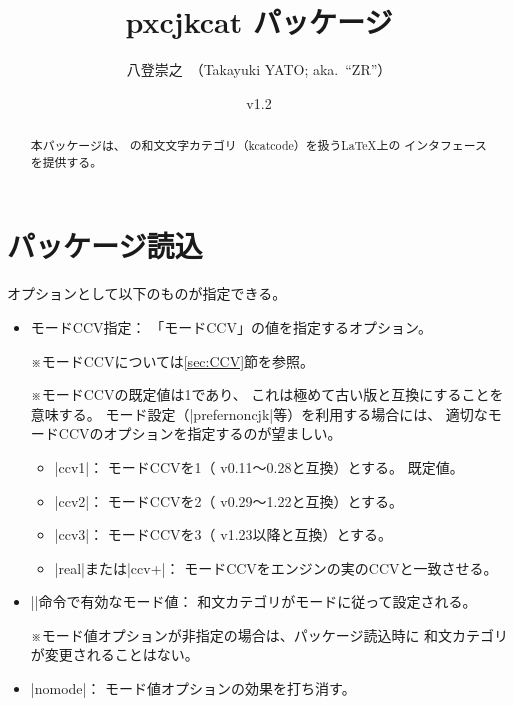 \documentclass[uplatex,dvipdfmx,a4paper]{jsarticle}
\newenvironment{myverbatim}
  {\quote\small\verbatim}
  {\endverbatim\endquote}
\newcommand{\PkgVersion}{1.2}
\newcommand{\PkgDate}{2022/05/25}
\newcommand{\Pkg}[1]{\textsf{#1}}
\newcommand{\Note}{\par\noindent ※}
\newcommand{\Means}{：\quad}
\newcommand{\strong}{\textsf}
\begin{document}
\title{\Pkg{pxcjkcat} パッケージ}
\author{八登崇之\ （Takayuki YATO; aka.~``ZR''）}
\date{v\PkgVersion\quad[\PkgDate]}
\maketitle

\begin{abstract}
本パッケージは、
{\upTeX}の和文文字カテゴリ（kcatcode）を扱う{\LaTeX}上の
インタフェースを提供する。
\end{abstract}

\tableofcontents

\section{パッケージ読込}
\label{sec:Loading}

\begin{myverbatim}
\usepackage[<オプション>]{pxcjkcat}
\end{myverbatim}

オプションとして以下のものが指定できる。

\begin{itemize}
\item \strong{モードCCV指定}\Means
  \<「モードCCV」の値を指定するオプション。
  \Note モードCCVについては\ref{sec:CCV}節を参照。
  \Note モードCCVの既定値は1であり、
  これは極めて古い版と互換にすることを意味する。
  モード設定（|prefernoncjk|等）を利用する場合には、
  適切なモードCCVのオプションを指定するのが望ましい。
  \begin{itemize}
  \item |ccv1|\Means
    モードCCVを1（{\upTeX} v0.11～0.28と互換）とする。
    \strong{既定値。}
  \item |ccv2|\Means
    モードCCVを2（{\upTeX} v0.29～1.22と互換）とする。
  \item |ccv3|\Means
    モードCCVを3（{\upTeX} v1.23以降と互換）とする。
  \item |real|または|ccv+|\Means
    モードCCVをエンジンの実のCCVと一致させる。
  \end{itemize}
\item |\cjkcategorymode|\strong{命令で有効なモード値}\Means
  和文カテゴリがモードに従って設定される。
  \Note モード値オプションが非指定の場合は、パッケージ読込時に
  和文カテゴリが変更されることはない。
\item |nomode|\Means
  モード値オプションの効果を打ち消す。
\end{itemize}
\end{document}
